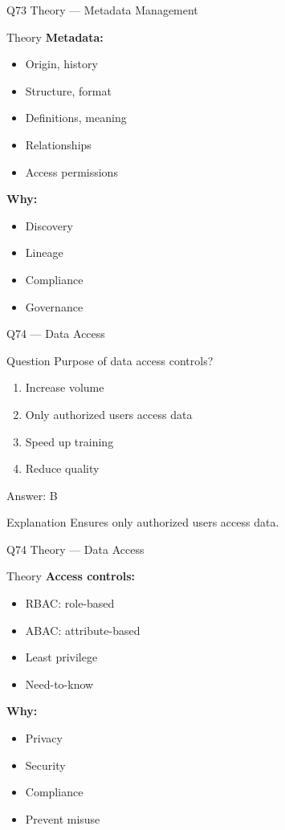 \documentclass[aspectratio=169,8pt]{beamer}
\begin{document}
	\begin{frame}{Q73 Theory --- Metadata Management}
		\begin{block}{Theory}
			\textbf{Metadata:}
			\begin{itemize}
				\item Origin, history
				\item Structure, format
				\item Definitions, meaning
				\item Relationships
				\item Access permissions
			\end{itemize}
			\textbf{Why:}
			\begin{itemize}
				\item Discovery
				\item Lineage
				\item Compliance
				\item Governance
			\end{itemize}
		\end{block}
	\end{frame}
	
	\begin{frame}{Q74 --- Data Access}
		\begin{block}{Question}
			Purpose of data access controls?
		\end{block}
		\begin{enumerate}[label=\Alph*.]
			\item Increase volume
			\item Only authorized users access data
			\item Speed up training
			\item Reduce quality
		\end{enumerate}
		\begin{exampleblock}{Answer: B}
		\end{exampleblock}
		\begin{block}{Explanation}
			Ensures only authorized users access data.
		\end{block}
	\end{frame}
	
	\begin{frame}{Q74 Theory --- Data Access}
		\begin{block}{Theory}
			\textbf{Access controls:}
			\begin{itemize}
				\item RBAC: role-based
				\item ABAC: attribute-based
				\item Least privilege
				\item Need-to-know
			\end{itemize}
			\textbf{Why:}
			\begin{itemize}
				\item Privacy
				\item Security
				\item Compliance
				\item Prevent misuse
			\end{itemize}
		\end{block}
	\end{frame}
	
\end{document}
